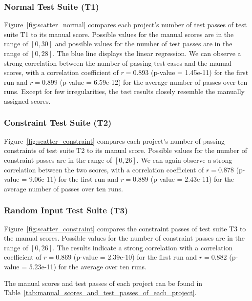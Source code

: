 \subsubsection{Normal Test Suite (T1)}

Figure~\ref{fig:scatter_normal} compares each project's number of test passes of test suite T1 to its manual score.
Possible values for the manual scores are in the range of $[0, 30]$ and possible values for the number of test passes are in the range of $[0, 28]$.
The blue line displays the linear regression.
We can observe a strong correlation between the number of passing test cases and the manual scores,
with a correlation coefficient of $r = 0.893$ (p-value = 1.45e-11) for the first run and $r = 0.899$ (p-value = 6.59e-12) for the average number of passes over ten runs.
Except for few irregularities, the test results closely resemble the manually assigned scores.

\subsubsection{Constraint Test Suite (T2)}

Figure~\ref{fig:scatter_constraint} compares each project's number of passing constraints of test suite T2 to its manual score.
Possible values for the number of constraint passes are in the range of $[0, 26]$.
We can again observe a strong correlation between the two scores,
with a correlation coefficient of $r = 0.878$ (p-value = 9.06e-11) for the first run and $r = 0.889$ (p-value = 2.43e-11) for the average number of passes over ten runs.

\subsubsection{Random Input Test Suite (T3)}

Figure~\ref{fig:scatter_constraint} compares the constraint passes of test suite T3 to the manual scores.
Possible values for the number of constraint passes are in the range of $[0, 26]$.
The results indicate a strong correlation with a correlation coefficient of $r = 0.869$ (p-value = 2.39e-10) for the first run and $r = 0.882$ (p-value = 5.23e-11) for the average over ten runs.
\parspace

\noindent The manual scores and test passes of each project can be found in Table~\ref{tab:manual_scores_and_test_passes_of_each_project}.

